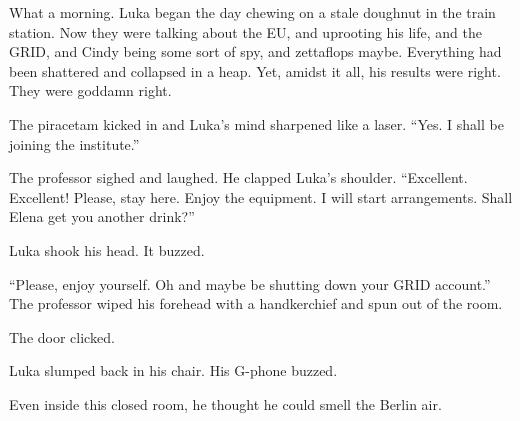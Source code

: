 \documentclass[ebook,11pt,oneside,openany]{memoir}
\begin{document}
What a morning. Luka began the day chewing on a stale doughnut in the train station. Now they were talking about the EU, and uprooting his life, and the GRID, and Cindy being some sort of spy, and zettaflops maybe. Everything had been shattered and collapsed in a heap. Yet, amidst it all, his results were right. They were goddamn right.

The piracetam kicked in and Luka's mind sharpened like a laser. ``Yes. I shall be joining the institute.''

The professor sighed and laughed. He clapped Luka's shoulder. ``Excellent. Excellent! Please, stay here. Enjoy the equipment. I will start arrangements. Shall Elena get you another drink?''

Luka shook his head. It buzzed.

``Please, enjoy yourself. Oh and maybe be shutting down your GRID account.'' The professor wiped his forehead with a handkerchief and spun out of the room.

The door clicked.

Luka slumped back in his chair. His G-phone buzzed.

Even inside this closed room, he thought he could smell the Berlin air.
\end{document}

